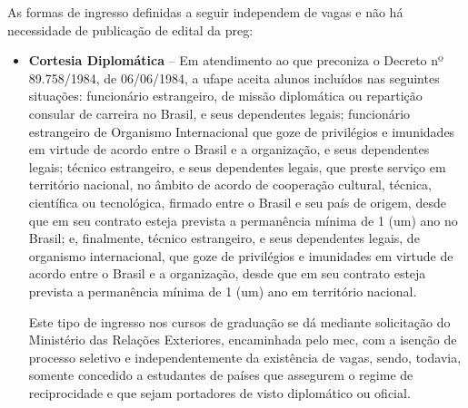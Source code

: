 \documentclass[
	12pt,				%
	openright,			%
  oneside,     %
	a4paper,			%
 hyphens,
	chapter=TITLE,		%
	english,			%
	french,				%
	spanish,			%
	brazil				%
	]{abntex2}
\begin{document}
As formas de ingresso definidas a seguir independem de vagas e não há necessidade de publicação de edital da \acrshort{preg}:

\begin{itemize}
    \item \textbf{Cortesia Diplomática} – Em atendimento ao que preconiza o Decreto nº 89.758/1984, de 06/06/1984, a \acrshort{ufape} aceita alunos incluídos nas seguintes situações: funcionário estrangeiro, de missão diplomática ou repartição consular de carreira no Brasil, e seus dependentes legais; funcionário estrangeiro de Organismo Internacional que goze de privilégios e imunidades em virtude de acordo entre o Brasil e a organização, e seus dependentes legais; técnico estrangeiro, e seus dependentes legais, que preste serviço em território nacional, no âmbito de acordo de cooperação cultural, técnica, científica ou tecnológica, firmado entre o Brasil e seu país de origem, desde que em seu contrato esteja prevista a permanência mínima de 1 (um) ano no Brasil; e, finalmente, técnico estrangeiro, e seus dependentes legais, de organismo internacional, que goze de privilégios e imunidades em virtude de acordo entre o Brasil e a organização, desde que em seu contrato esteja prevista a permanência mínima de 1 (um) ano em território nacional.

    Este tipo de ingresso nos cursos de graduação se dá mediante solicitação do Ministério das Relações Exteriores, encaminhada pelo \acrshort{mec}, com a isenção de processo seletivo e independentemente da existência de vagas, sendo, todavia, somente concedido a estudantes de países que assegurem o regime de reciprocidade e que sejam portadores de visto diplomático ou oficial.


\end{itemize}
\end{document}
